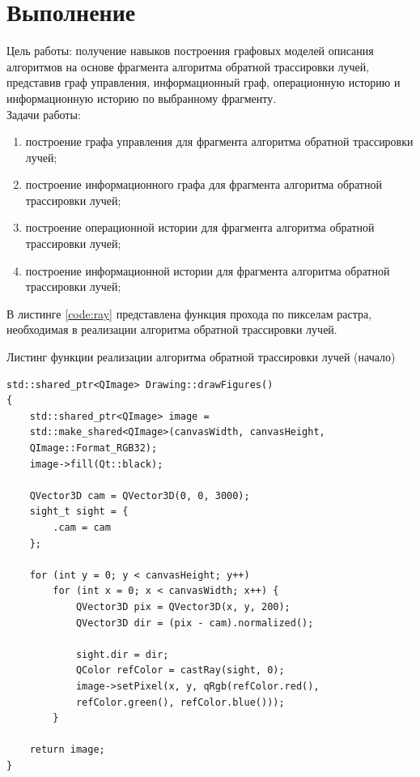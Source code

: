 \setcounter{page}{2}
\chapter{Выполнение}
Цель работы: получение навыков построения графовых моделей описания алгоритмов на основе фрагмента алгоритма обратной трассировки лучей, представив граф управления, информационный граф, операционную историю и информационную историю по выбранному фрагменту.\\

Задачи работы:
\begin{enumerate}[label={\arabic*)}]
	\item построение графа управления для фрагмента алгоритма обратной трассировки лучей;
	\item построение информационного графа для фрагмента алгоритма обратной трассировки лучей;
	\item построение операционной истории для фрагмента алгоритма обратной трассировки лучей;
	\item построение информационной истории для фрагмента алгоритма обратной трассировки лучей;
\end{enumerate}

\newpage

В листинге \ref{code:ray} представлена функция прохода по пикселам растра, необходимая в реализации алгоритма обратной трассировки лучей.

\begin{code}
\caption{Листинг функции реализации алгоритма обратной трассировки лучей (начало)}
\label{code:ray}
\begin{verbatim}
std::shared_ptr<QImage> Drawing::drawFigures()
{
    std::shared_ptr<QImage> image = 
    std::make_shared<QImage>(canvasWidth, canvasHeight, 
    QImage::Format_RGB32);
    image->fill(Qt::black);

    QVector3D cam = QVector3D(0, 0, 3000);
    sight_t sight = {
        .cam = cam
    };

    for (int y = 0; y < canvasHeight; y++)
        for (int x = 0; x < canvasWidth; x++) {
            QVector3D pix = QVector3D(x, y, 200);
            QVector3D dir = (pix - cam).normalized();

            sight.dir = dir;
            QColor refColor = castRay(sight, 0);
            image->setPixel(x, y, qRgb(refColor.red(), 
            refColor.green(), refColor.blue()));
        }

    return image;
}

\end{verbatim}
\end{code}

